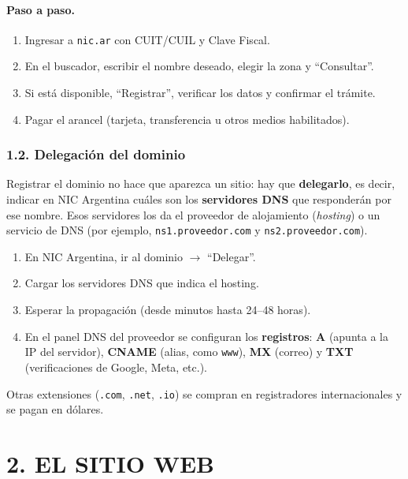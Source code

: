 \paragraph*{Paso a paso.}
\begin{enumerate}
  \item Ingresar a \texttt{nic.ar} con CUIT/CUIL y Clave Fiscal.
  \item En el buscador, escribir el nombre deseado, elegir la zona y ``Consultar''.
  \item Si está disponible, ``Registrar'', verificar los datos y confirmar el trámite.
  \item Pagar el arancel (tarjeta, transferencia u otros medios habilitados).
\end{enumerate}

\subsubsection*{1.2. Delegación del dominio}
Registrar el dominio no hace que aparezca un sitio: hay que \textbf{delegarlo}, es decir,
indicar en NIC Argentina cuáles son los \textbf{servidores DNS} que responderán por ese nombre.
Esos servidores los da el proveedor de alojamiento (\textit{hosting}) o un servicio de DNS
(por ejemplo, \texttt{ns1.proveedor.com} y \texttt{ns2.proveedor.com}).

\begin{enumerate}
  \item En NIC Argentina, ir al dominio $\rightarrow$ ``Delegar''.
  \item Cargar los servidores DNS que indica el hosting.
  \item Esperar la propagación (desde minutos hasta 24--48 horas).
  \item En el panel DNS del proveedor se configuran los \textbf{registros}:
        \textbf{A} (apunta a la IP del servidor), \textbf{CNAME} (alias, como \texttt{www}),
        \textbf{MX} (correo) y \textbf{TXT} (verificaciones de Google, Meta, etc.).
\end{enumerate}

Otras extensiones (\texttt{.com}, \texttt{.net}, \texttt{.io}) se compran en registradores
internacionales y se pagan en dólares.

\section*{2. EL SITIO WEB}

